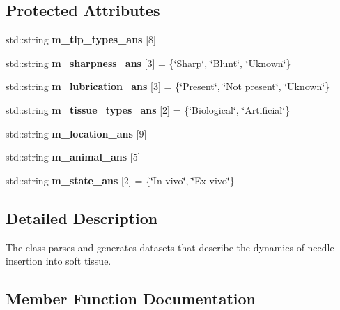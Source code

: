 \subsection*{Protected Attributes}
\begin{DoxyCompactItemize}
\item 
std\+::string {\bfseries m\+\_\+tip\+\_\+types\+\_\+ans} \mbox{[}8\mbox{]}
\item 
\mbox{\label{classAxialForceDataset_a17b6b2de4b385df3cee3ea5af610fde6}} 
std\+::string {\bfseries m\+\_\+sharpness\+\_\+ans} \mbox{[}3\mbox{]} = \{\char`\"{}Sharp\char`\"{}, \char`\"{}Blunt\char`\"{}, \char`\"{}Uknown\char`\"{}\}
\item 
\mbox{\label{classAxialForceDataset_afd10fd949b8bfb5b1c02824010de0f37}} 
std\+::string {\bfseries m\+\_\+lubrication\+\_\+ans} \mbox{[}3\mbox{]} = \{\char`\"{}Present\char`\"{}, \char`\"{}Not present\char`\"{}, \char`\"{}Uknown\char`\"{}\}
\item 
\mbox{\label{classAxialForceDataset_a822700844606dcdf3ef80e1d4237537e}} 
std\+::string {\bfseries m\+\_\+tissue\+\_\+types\+\_\+ans} \mbox{[}2\mbox{]} = \{\char`\"{}Biological\char`\"{}, \char`\"{}Artificial\char`\"{}\}
\item 
std\+::string {\bfseries m\+\_\+location\+\_\+ans} \mbox{[}9\mbox{]}
\item 
std\+::string {\bfseries m\+\_\+animal\+\_\+ans} \mbox{[}5\mbox{]}
\item 
\mbox{\label{classAxialForceDataset_ab505fd1e344c21773001617c355b014a}} 
std\+::string {\bfseries m\+\_\+state\+\_\+ans} \mbox{[}2\mbox{]} = \{\char`\"{}In vivo\char`\"{}, \char`\"{}Ex vivo\char`\"{}\}
\end{DoxyCompactItemize}


\subsection{Detailed Description}
The class parses and generates datasets that describe the dynamics of needle insertion into soft tissue. 

\subsection{Member Function Documentation}
\mbox{\label{classAxialForceDataset_a603fe9e768304f3aa7bd9dc32ab34853}} 
